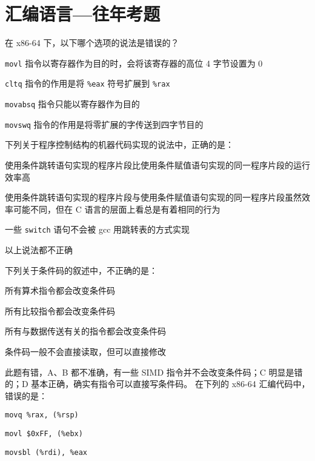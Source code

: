 \chapter{汇编语言{---}往年考题}\thispagestyle{empty}
    \begin{problems}
         在 x86-64 下，以下哪个选项的说法是错误的？
        \begin{choices}
            \item \verb|movl| 指令以寄存器作为目的时，会将该寄存器的高位 4 字节设置为 0
            \item \verb|cltq| 指令的作用是将 \verb|%eax| 符号扩展到 \verb|%rax|
            \item \verb|movabsq| 指令只能以寄存器作为目的
            \item \verb|movswq| 指令的作用是将零扩展的字传送到四字节目的
        \end{choices}
         下列关于程序控制结构的机器代码实现的说法中，正确的是：
        \begin{choices}
            \item 使用条件跳转语句实现的程序片段比使用条件赋值语句实现的同一程序片段的运行效率高
            \item 使用条件跳转语句实现的程序片段与使用条件赋值语句实现的同一程序片段虽然效率可能不同，但在 C 语言的层面上看总是有着相同的行为
            \item 一些 \verb|switch| 语句不会被 gcc 用跳转表的方式实现
            \item 以上说法都不正确
        \end{choices}
         下列关于条件码的叙述中，不正确的是：
        \begin{choices}
            \item 所有算术指令都会改变条件码
            \item 所有比较指令都会改变条件码
            \item 所有与数据传送有关的指令都会改变条件码
            \item 条件码一般不会直接读取，但可以直接修改
        \end{choices}
        \sol 此题有错，A、B 都不准确，有一些 SIMD 指令并不会改变条件码；C 明显是错的；D 基本正确，确实有指令可以直接写条件码。
         在下列的 x86-64 汇编代码中，错误的是：
        \begin{choices}
            \item \verb|movq %rax, (%rsp)|
            \item \verb|movl $0xFF, (%ebx)|
            \item \verb|movsbl (%rdi), %eax|

\end{choices}
\end{problems}
